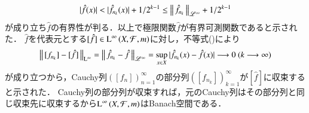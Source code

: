 \begin{prf}
\begin{description}
			\begin{align}
				|\hat{f}(x)| < |\hat{f}_{n_k}(x)| + 1/2^{k-1} \leq \left\|\, \hat{f}_{n_k}\, \right\|_{\mathscr{L}^\infty} + 1/2^{k-1}
			\end{align}
			が成り立ち$\hat{f}$の有界性が判る．以上で極限関数$\hat{f}$が有界可測関数であると示された．
			$\hat{f}$を代表元とする$[\hat{f}] \in \operatorname{L}^{\infty} \left(X,\mathcal{F},m\right)$に対し，不等式()により
			\begin{align}
				\left\|\, [f_{n_k}] - [\hat{f}]\, \right\|_{\mathrm{L}^\infty} = \left\|\, \hat{f}_{n_k} - \hat{f}\, \right\|_{\mathscr{L}^\infty} 
				= \operatorname*{sup}_{x \in X} |\hat{f}_{n_k}(x) - \hat{f}(x)|
				\longrightarrow 0 \ (k \longrightarrow \infty)
			\end{align}
			が成り立つから，Cauchy列$\left( [f_{n}] \right)_{n=1}^{\infty}$の部分列$\left( [f_{n_k}] \right)_{k=1}^{\infty}$が$[\hat{f}]$に収束すると示された．
			Cauchy列の部分列が収束すれば，元のCauchy列はその部分列と同じ収束先に収束するから$\operatorname{L}^{\infty} \left(X,\mathcal{F},m\right)$はBanach空間である．
			

\end{description}
\end{prf}
